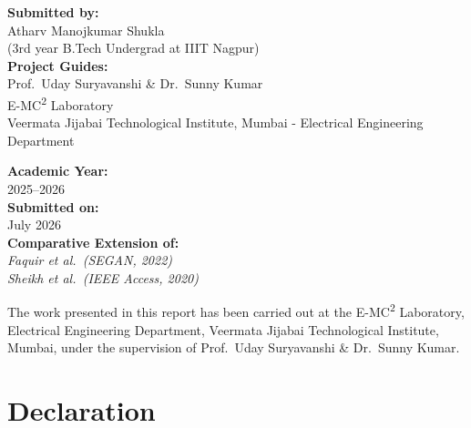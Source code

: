 \documentclass[12pt, oneside, a4paper]{report}
\theoremstyle{definition}
\theoremstyle{remark}
\begin{document}
\begin{titlepage}
\begin{minipage}[t]{0.45\textwidth}
  \begin{flushleft}
    \textbf{Submitted by:}\\[0.2cm]
    Atharv Manojkumar Shukla\\
    (3rd year B.Tech Undergrad at IIIT Nagpur)\\[0.5cm]
    \textbf{Project Guides:}\\[0.2cm]
    Prof.\ Uday Suryavanshi \& Dr.\ Sunny Kumar\\
    E-MC\textsuperscript{2} Laboratory\\
    Veermata Jijabai Technological Institute, Mumbai - Electrical Engineering Department
  \end{flushleft}
\end{minipage}
\hfill
\begin{minipage}[t]{0.45\textwidth}
  \begin{flushright}
    \textbf{Academic Year:}\\[0.2cm]
    2025--2026\\[0.5cm]
    \textbf{Submitted on:}\\[0.2cm]
    July 2026\\[0.5cm]
    \textbf{Comparative Extension of:}\\[0.2cm]
    \emph{Faquir et al.\ (SEGAN, 2022)}\\
    \emph{Sheikh et al.\ (IEEE Access, 2020)}
  \end{flushright}
\end{minipage}

\vfill

{\small The work presented in this report has been carried out at the E-MC\textsuperscript{2} Laboratory, Electrical Engineering Department, Veermata Jijabai Technological Institute, Mumbai, under the supervision of Prof.\ Uday Suryavanshi \& Dr.\ Sunny Kumar.}

\end{titlepage}


\cleardoublepage


\chapter*{Declaration}
\end{document}
